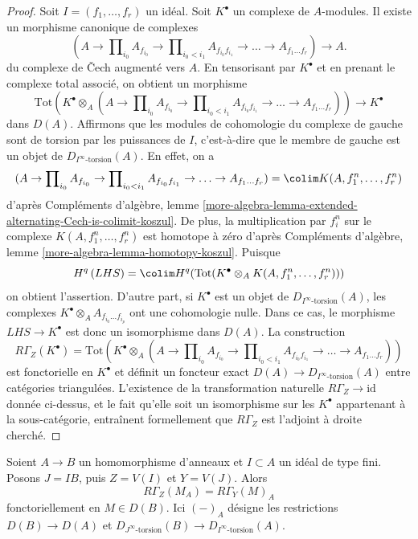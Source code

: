 \begin{proof}
Soit $I = (f_1, \ldots, f_r)$ un idéal.
Soit $K^\bullet$ un complexe de $A$-modules.
Il existe un morphisme canonique de complexes
$$
(A \to \prod\nolimits_{i_0} A_{f_{i_0}} \to
\prod\nolimits_{i_0 < i_1} A_{f_{i_0}f_{i_1}} \to
\ldots \to A_{f_1\ldots f_r}) \longrightarrow A.
$$
du complexe de {\v C}ech augmenté vers $A$.
En tensorisant par $K^\bullet$ et en prenant le complexe total associé,
on obtient un morphisme
$$
\text{Tot}\left(
K^\bullet \otimes_A
(A \to \prod\nolimits_{i_0} A_{f_{i_0}} \to
\prod\nolimits_{i_0 < i_1} A_{f_{i_0}f_{i_1}} \to
\ldots \to A_{f_1\ldots f_r})\right)
\longrightarrow
K^\bullet
$$
dans $D(A)$. Affirmons que les modules de cohomologie du complexe
de gauche sont de torsion par les puissances de $I$,
c'est-à-dire que le membre de gauche est un objet de $D_{I^\infty\text{-torsion}}(A)$.
En effet, on a
$$
(A \to \prod\nolimits_{i_0} A_{f_{i_0}} \to
\prod\nolimits_{i_0 < i_1} A_{f_{i_0}f_{i_1}} \to
\ldots \to A_{f_1\ldots f_r}) = \colim K(A, f_1^n, \ldots, f_r^n)
$$
d'après Compléments d'algèbre, lemme \ref{more-algebra-lemma-extended-alternating-Cech-is-colimit-koszul}.
De plus, la multiplication par $f_i^n$ sur le complexe
$K(A, f_1^n, \ldots, f_r^n)$ est homotope à zéro d'après Compléments d'algèbre, lemme \ref{more-algebra-lemma-homotopy-koszul}.
Puisque
$$
H^q\left( LHS \right) =
\colim H^q(\text{Tot}(K^\bullet \otimes_A K(A, f_1^n, \ldots, f_r^n)))
$$
on obtient l'assertion. D'autre part, si $K^\bullet$ est un objet de $D_{I^\infty\text{-torsion}}(A)$,
les complexes $K^\bullet \otimes_A A_{f_{i_0} \ldots f_{i_p}}$ ont une cohomologie nulle.
Dans ce cas, le morphisme $LHS \to K^\bullet$ est donc un isomorphisme dans $D(A)$.
La construction
$$
R\Gamma_Z(K^\bullet) =
\text{Tot}\left(
K^\bullet \otimes_A
(A \to \prod\nolimits_{i_0} A_{f_{i_0}} \to
\prod\nolimits_{i_0 < i_1} A_{f_{i_0}f_{i_1}} \to
\ldots \to A_{f_1\ldots f_r})\right)
$$
est fonctorielle en $K^\bullet$ et définit un foncteur exact
$D(A) \to D_{I^\infty\text{-torsion}}(A)$ entre catégories triangulées.
L'existence de la transformation naturelle $R\Gamma_Z \to \text{id}$ donnée ci-dessus,
et le fait qu'elle soit un isomorphisme sur les $K^\bullet$ appartenant
à la sous-catégorie, entraînent formellement que $R\Gamma_Z$
est l'adjoint à droite cherché.
\end{proof}

\begin{lemma}
\label{lemma-local-cohomology-and-restriction}
Soient $A \to B$ un homomorphisme d'anneaux et $I \subset A$ un idéal de type fini.
Posons $J = IB$, puis $Z = V(I)$ et $Y = V(J)$. Alors
$$
R\Gamma_Z(M_A) = R\Gamma_Y(M)_A
$$
fonctoriellement en $M \in D(B)$. Ici $(-)_A$ désigne les restrictions
$D(B) \to D(A)$ et $D_{J^\infty\text{-torsion}}(B) \to D_{I^\infty\text{-torsion}}(A)$.
\end{lemma}

